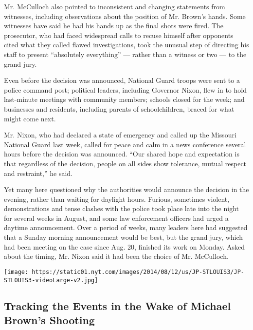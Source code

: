 Mr. McCulloch also pointed to inconsistent and changing statements from
witnesses, including observations about the position of Mr. Brown's
hands. Some witnesses have said he had his hands up as the final shots
were fired. The prosecutor, who had faced widespread calls to recuse
himself after opponents cited what they called flawed investigations,
took the unusual step of directing his staff to present ``absolutely
everything'' --- rather than a witness or two --- to the grand jury.

Even before the decision was announced, National Guard troops were sent
to a police command post; political leaders, including Governor Nixon,
flew in to hold last-minute meetings with community members; schools
closed for the week; and businesses and residents, including parents of
schoolchildren, braced for what might come next.

Mr. Nixon, who had declared a state of emergency and called up the
Missouri National Guard last week, called for peace and calm in a news
conference several hours before the decision was announced. ``Our shared
hope and expectation is that regardless of the decision, people on all
sides show tolerance, mutual respect and restraint,'' he said.

Yet many here questioned why the authorities would announce the decision
in the evening, rather than waiting for daylight hours. Furious,
sometimes violent, demonstrations and tense clashes with the police took
place late into the night for several weeks in August, and some law
enforcement officers had urged a daytime announcement. Over a period of
weeks, many leaders here had suggested that a Sunday morning
announcement would be best, but the grand jury, which had been meeting
on the case since Aug. 20, finished its work on Monday. Asked about the
timing, Mr. Nixon said it had been the choice of Mr. McCulloch.

\href{https://www.nytimes.com/interactive/2014/11/09/us/10ferguson-michael-brown-shooting-grand-jury-darren-wilson.html}{}

\texttt{[image: https://static01.nyt.com/images/2014/08/12/us/JP-STLOUIS3/JP-STLOUIS3-videoLarge-v2.jpg]}

\hypertarget{tracking-the-events-in-the-wake-of-michael-browns-shooting}{%
\subsection{Tracking the Events in the Wake of Michael Brown's
Shooting}\label{tracking-the-events-in-the-wake-of-michael-browns-shooting}}

